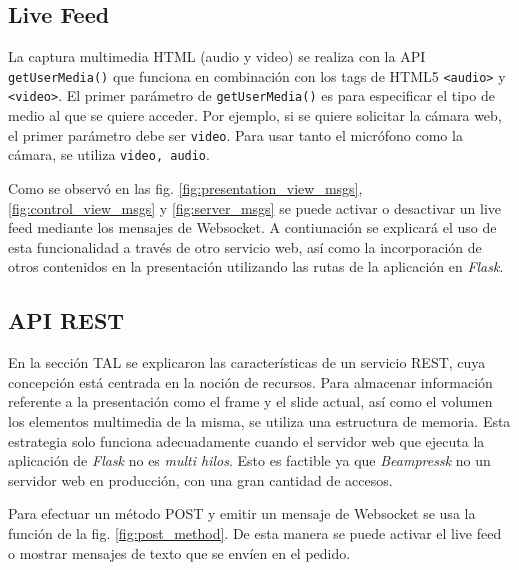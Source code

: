
		\subsection{Live Feed} %
		\label{sub:live_feed}

			La captura multimedia HTML (audio y video) se realiza con la API \texttt{getUserMedia()} que funciona en combinación con los tags de HTML5 \texttt{<audio>} y \texttt{<video>}. El primer parámetro de \texttt{getUserMedia()} es para especificar el tipo de medio al que se quiere acceder. Por ejemplo, si se quiere solicitar la cámara web, el primer parámetro debe ser \texttt{video}. Para usar tanto el micrófono como la cámara, se utiliza \texttt{video, audio}.

			Como se observó en las fig. \ref{fig:presentation_view_msgs}, \ref{fig:control_view_msgs} y \ref{fig:server_msgs} se puede activar o desactivar un live feed mediante los mensajes de Websocket. A contiunación se explicará el uso de esta funcionalidad a través de otro servicio web, así como la incorporación de otros contenidos en la presentación utilizando las rutas de la aplicación en \textit{Flask}.
		
		

		\subsection{API REST} %
		\label{sub:api_rest}
			En la sección TAL se explicaron las características de un servicio REST, cuya concepción está centrada en la noción de recursos. Para almacenar información referente a la presentación como el frame y el slide actual, así como el volumen los elementos multimedia de la misma, se utiliza una estructura de memoria. Esta estrategia solo funciona adecuadamente cuando el servidor web que ejecuta la aplicación de \textit{Flask} no es \textit{multi hilos}. Esto es factible ya que \textit{Beampressk} no un servidor web en producción, con una gran cantidad de accesos.

			Para efectuar un método POST y emitir un mensaje de Websocket se usa la función de la fig. \ref{fig:post_method}. De esta manera se puede activar el live feed o mostrar mensajes de texto que se envíen en el pedido.

